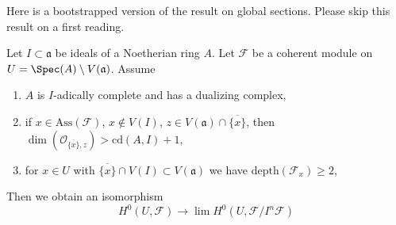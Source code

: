\noindent
Here is a bootstrapped version of the result on global sections.
Please skip this result on a first reading.

\begin{lemma}
\label{lemma-application-H0}
Let $I \subset \mathfrak a$ be ideals of a Noetherian ring $A$.
Let $\mathcal{F}$ be a coherent module on
$U = \Spec(A) \setminus V(\mathfrak a)$.
Assume
\begin{enumerate}
\item $A$ is $I$-adically complete and has a dualizing complex,
\item if $x \in \text{Ass}(\mathcal{F})$, $x \not \in V(I)$,
$z \in V(\mathfrak a) \cap \overline{\{x\}}$, then
$\dim(\mathcal{O}_{\overline{\{x\}}, z}) > \text{cd}(A, I) + 1$,
\item for $x \in U$ with $\overline{\{x\}} \cap V(I) \subset V(\mathfrak a)$
we have $\text{depth}(\mathcal{F}_x) \geq 2$,
\end{enumerate}
Then we obtain an isomorphism
$$
H^0(U, \mathcal{F})
\longrightarrow
\lim H^0(U, \mathcal{F}/I^n\mathcal{F})
$$
\end{lemma}

